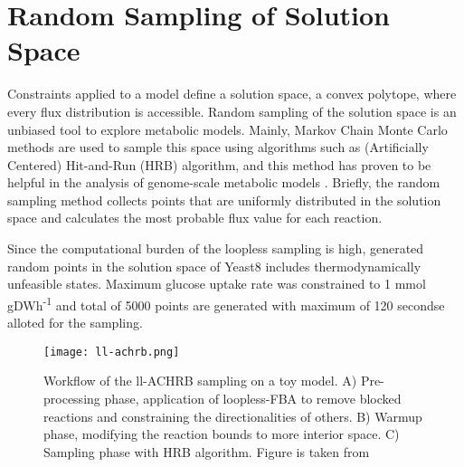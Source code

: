 \section{Random Sampling of Solution Space}
Constraints applied to a model define a solution space, a convex polytope, where every flux distribution is accessible. Random sampling of the solution space is an unbiased tool to explore metabolic models. Mainly, Markov Chain Monte Carlo methods are used to sample this space using algorithms such as (Artificially Centered) Hit-and-Run (HRB) \cite{kiatsupaibul2011analysis, saa2016ll} algorithm, and this method has proven to be helpful in the analysis of genome-scale metabolic models \cite{schellenberger2009use}. Briefly, the random sampling method collects points that are uniformly distributed in the solution space and calculates the most probable flux value for each reaction.

Since the computational burden of the loopless sampling is high, generated random points in the solution space of Yeast8 includes thermodynamically unfeasible states. Maximum glucose uptake rate was constrained to 1 mmol gDWh\textsuperscript{-1} and total of 5000 points are generated with maximum of 120 secondse alloted for the sampling.

\begin{figure}[H]
\begin{center}
\texttt{[image: ll-achrb.png]}
\end{center}
\caption[Workflow of the Loopless-ACHRB sampling on a toy model]{Workflow of the ll-ACHRB sampling on a toy model. A) Pre-processing phase, application of loopless-FBA to remove blocked reactions and constraining the directionalities of others. B) Warmup phase, modifying the reaction bounds to more interior space. C) Sampling phase with HRB algorithm. Figure is taken from \cite{saa2016ll}}
\label{fig:achrb}
\end{figure}
